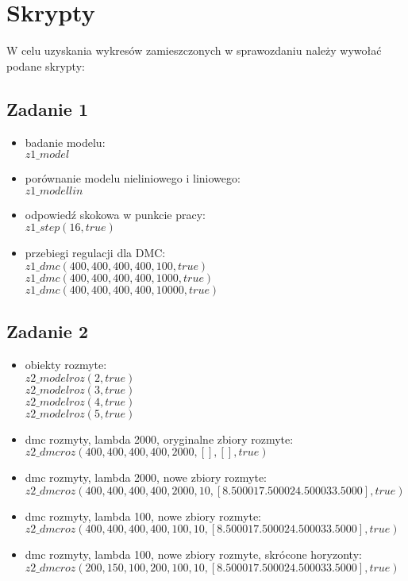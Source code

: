 \chapter{Skrypty}
	\label{ch:skrypty}
	W celu uzyskania wykresów zamieszczonych w sprawozdaniu należy wywołać podane skrypty:
	\section{Zadanie 1}
	\begin{itemize}
		\item badanie modelu:\\
		$z1\_model$
		\item porównanie modelu nieliniowego i liniowego:\\
		$z1\_modellin$
		\item odpowiedź skokowa w punkcie pracy:\\
		$z1\_step(16, true)$
		\item przebiegi regulacji dla DMC:\\
		$z1\_dmc(400, 400, 400, 400, 100, true)$\\
		$z1\_dmc(400, 400, 400, 400, 1000, true)$\\
		$z1\_dmc(400, 400, 400, 400, 10000, true)$\\	
	\end{itemize}
	\section{Zadanie 2}
	\begin{itemize}
		\item obiekty rozmyte:\\
		$z2\_modelroz(2, true)$\\
		$z2\_modelroz(3, true)$\\
		$z2\_modelroz(4, true)$\\
		$z2\_modelroz(5, true)$\\
		\item dmc rozmyty, lambda 2000, oryginalne zbiory rozmyte:\\
		$z2\_dmcroz(400, 400, 400, 400, 2000,[],[], true)$
		\item dmc rozmyty, lambda 2000, nowe zbiory rozmyte:\\
		$z2\_dmcroz(400, 400, 400, 400, 2000,10,[8.5000   17.5000   24.5000   33.5000], true)$
		\item dmc rozmyty, lambda 100, nowe zbiory rozmyte:\\
		$z2\_dmcroz(400, 400, 400, 400, 100,10,[8.5000   17.5000   24.5000   33.5000], true)$
		\item dmc rozmyty, lambda 100, nowe zbiory rozmyte, skrócone horyzonty:\\
		$z2\_dmcroz(200, 150, 100, 200, 100,10,[8.5000   17.5000   24.5000   33.5000], true)$
	\end{itemize}
